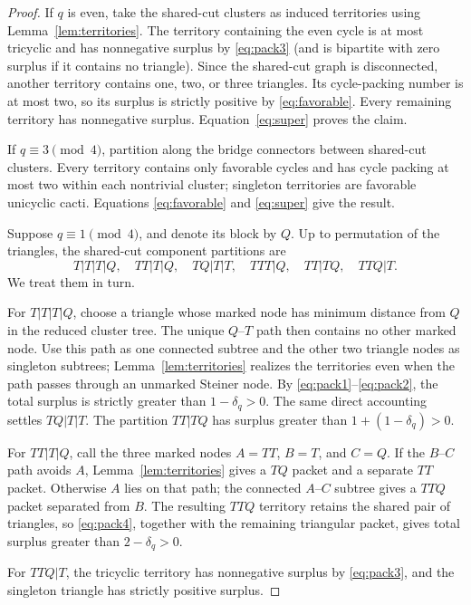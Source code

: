 \documentclass[11pt]{article}
\begin{document}
\begin{proof}
If $q$ is even, take the shared-cut clusters as induced territories using
Lemma~\ref{lem:territories}.  The territory containing the even cycle is at
most tricyclic and has nonnegative surplus by \eqref{eq:pack3} (and is
bipartite with zero surplus if it contains no triangle).  Since the shared-cut
graph is disconnected, another territory contains one, two, or three
triangles.  Its cycle-packing number is at most two, so its surplus is strictly
positive by \eqref{eq:favorable}.  Every remaining territory has nonnegative
surplus.  Equation~\eqref{eq:super} proves the claim.

If $q\equiv3\pmod4$, partition along the bridge connectors between shared-cut
clusters.  Every territory contains only favorable cycles and has cycle
packing at most two within each nontrivial cluster; singleton territories are
favorable unicyclic cacti.  Equations \eqref{eq:favorable} and
\eqref{eq:super} give the result.

Suppose $q\equiv1\pmod4$, and denote its block by $Q$.  Up to permutation of
the triangles, the shared-cut component partitions are
\[
 T|T|T|Q,\quad TT|T|Q,\quad TQ|T|T,
 \quad TTT|Q,\quad TT|TQ,\quad TTQ|T.
\]
We treat them in turn.

For $T|T|T|Q$, choose a triangle whose marked node has minimum distance from
$Q$ in the reduced cluster tree.  The unique $Q$--$T$ path then contains no
other marked node.  Use this path as one connected subtree and the other two
triangle nodes as singleton subtrees; Lemma~\ref{lem:territories} realizes the
territories even when the path passes through an unmarked Steiner node.  By
\eqref{eq:pack1}--\eqref{eq:pack2}, the total surplus is
strictly greater than $1-\delta_q>0$.  The same direct accounting settles
$TQ|T|T$.  The partition $TT|TQ$ has surplus greater than
$1+(1-\delta_q)>0$.

For $TT|T|Q$, call the three marked nodes $A=TT$, $B=T$, and $C=Q$.  If the
$B$--$C$ path avoids $A$, Lemma~\ref{lem:territories} gives a $TQ$ packet and
a separate $TT$ packet.  Otherwise $A$ lies on that path; the connected
$A$--$C$ subtree gives a $TTQ$ packet separated from $B$.  The resulting
$TTQ$ territory retains the shared pair of triangles, so
\eqref{eq:pack4}, together with the remaining triangular packet, gives total
surplus greater than $2-\delta_q>0$.

For $TTQ|T$, the tricyclic territory has nonnegative surplus by
\eqref{eq:pack3}, and the singleton triangle has strictly positive surplus.


\end{proof}
\end{document}
